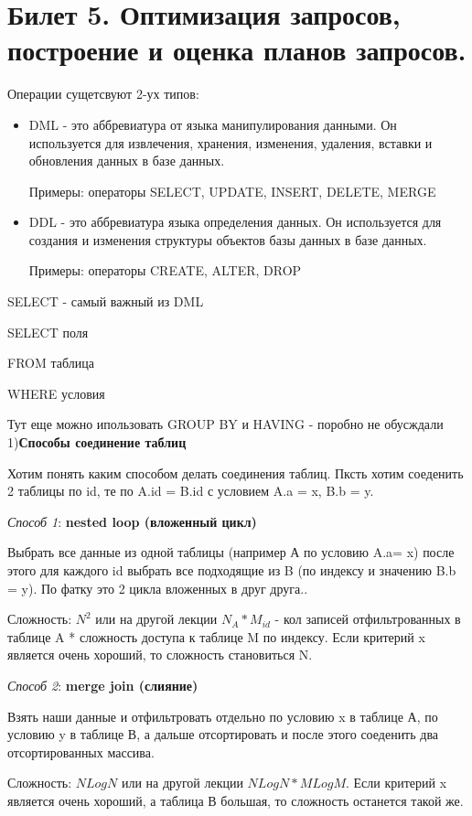 \newpage
\section {Билет 5. Оптимизация запросов, построение и оценка планов запросов.}

Операции сущетсвуют 2-ух типов: 
\begin{itemize}
	\item DML - это аббревиатура от языка манипулирования данными. Он используется для извлечения, хранения, изменения, удаления, вставки и обновления данных в базе данных.
	
	Примеры: операторы SELECT, UPDATE, INSERT, DELETE, MERGE
	
	\item DDL - это аббревиатура языка определения данных. Он используется для создания и изменения структуры объектов базы данных в базе данных.
	
	Примеры: операторы CREATE, ALTER, DROP
\end{itemize}


SELECT - самый важный из DML

SELECT поля

FROM таблица 

WHERE условия 

Тут еще можно ипользовать GROUP BY и HAVING - поробно не обусждали 
\\[10pt]
1)\textbf{Способы соединение таблиц }

Хотим понять каким способом делать соединения таблиц. Пксть хотим соеденить 2 таблицы по id, те по A.id = B.id с условием A.a = x, B.b = y.

\textit{Способ 1}: \textbf{nested loop (вложенный цикл)}

Выбрать все данные из одной таблицы (например А по условию A.a= x) после этого для каждого id выбрать все подходящие из B (по индексу и значению B.b = y). По фатку это 2 цикла вложенных в друг друга..

Сложность: $N^2$ или на другой лекции $N_A * M_{id}$  -  кол записей отфильтрованных в таблице A * сложность доступа к таблице M по индексу. Если критерий x является очень хороший, то сложность становиться N. 

\textit{Способ 2}: \textbf{merge join (слияние)}

Взять наши данные и отфильтровать отдельно по условию x в таблице А, по условию y в таблице В, а дальше отсортировать и после этого соеденить два отсортированных массива.

Сложность: $NLogN$  или на другой лекции $NLogN * MLogM$. Если критерий x является очень хороший, а таблица В большая, то сложность останется такой же. 

